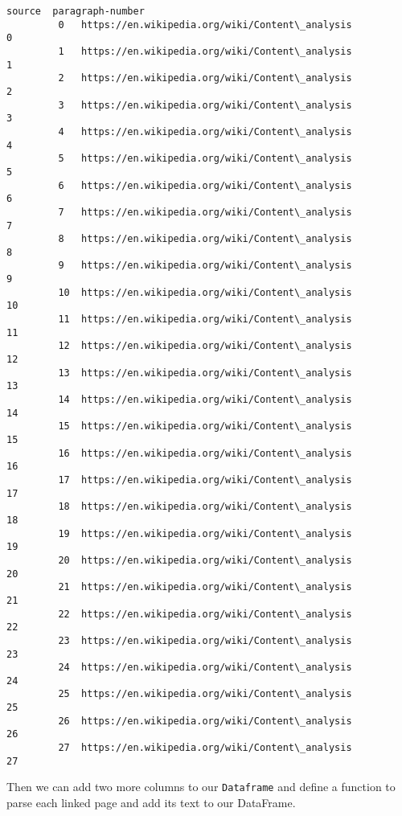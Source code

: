 \documentclass[11pt]{article}
\begin{document}
\begin{Verbatim}[commandchars=\\\{\}]
                                                     source  paragraph-number  
         0   https://en.wikipedia.org/wiki/Content\_analysis                 0  
         1   https://en.wikipedia.org/wiki/Content\_analysis                 1  
         2   https://en.wikipedia.org/wiki/Content\_analysis                 2  
         3   https://en.wikipedia.org/wiki/Content\_analysis                 3  
         4   https://en.wikipedia.org/wiki/Content\_analysis                 4  
         5   https://en.wikipedia.org/wiki/Content\_analysis                 5  
         6   https://en.wikipedia.org/wiki/Content\_analysis                 6  
         7   https://en.wikipedia.org/wiki/Content\_analysis                 7  
         8   https://en.wikipedia.org/wiki/Content\_analysis                 8  
         9   https://en.wikipedia.org/wiki/Content\_analysis                 9  
         10  https://en.wikipedia.org/wiki/Content\_analysis                10  
         11  https://en.wikipedia.org/wiki/Content\_analysis                11  
         12  https://en.wikipedia.org/wiki/Content\_analysis                12  
         13  https://en.wikipedia.org/wiki/Content\_analysis                13  
         14  https://en.wikipedia.org/wiki/Content\_analysis                14  
         15  https://en.wikipedia.org/wiki/Content\_analysis                15  
         16  https://en.wikipedia.org/wiki/Content\_analysis                16  
         17  https://en.wikipedia.org/wiki/Content\_analysis                17  
         18  https://en.wikipedia.org/wiki/Content\_analysis                18  
         19  https://en.wikipedia.org/wiki/Content\_analysis                19  
         20  https://en.wikipedia.org/wiki/Content\_analysis                20  
         21  https://en.wikipedia.org/wiki/Content\_analysis                21  
         22  https://en.wikipedia.org/wiki/Content\_analysis                22  
         23  https://en.wikipedia.org/wiki/Content\_analysis                23  
         24  https://en.wikipedia.org/wiki/Content\_analysis                24  
         25  https://en.wikipedia.org/wiki/Content\_analysis                25  
         26  https://en.wikipedia.org/wiki/Content\_analysis                26  
         27  https://en.wikipedia.org/wiki/Content\_analysis                27  
\end{Verbatim}
            
    Then we can add two more columns to our \texttt{Dataframe} and define a
function to parse each linked page and add its text to our DataFrame.
\end{document}
